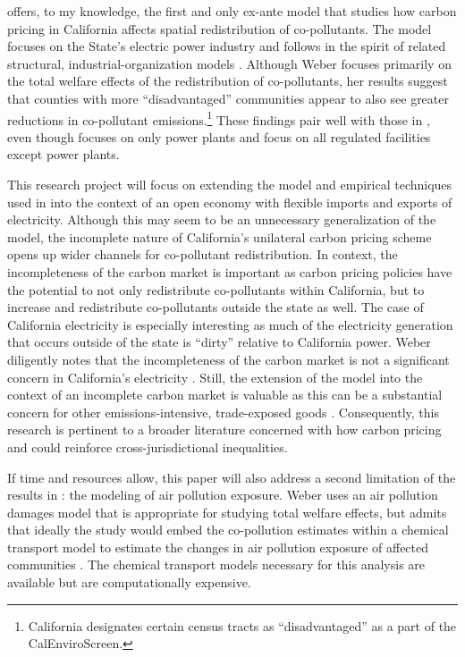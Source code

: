 \documentclass[11pt]{article}
\begin{document}
\cite{weber2021dynamic} offers, to my knowledge, the first and only ex-ante model that studies how carbon pricing in California affects spatial redistribution of co-pollutants. The model focuses on the State's electric power industry and follows in the spirit of related structural, industrial-organization models \citep[e.g., ~][]{gowrisankaran2022policy, abito2022role}. Although Weber focuses primarily on the total welfare effects of the redistribution of co-pollutants, her results suggest that counties with more ``disadvantaged” communities appear to also see greater reductions in co-pollutant emissions.\footnote{California designates certain census tracts as ``disadvantaged” as a part of the CalEnviroScreen.} These findings pair well with those in \cite{hernandez2023environmental}, even though \cite{weber2021dynamic} focuses on only power plants and \cite{hernandez2023environmental} focus on all regulated facilities except power plants.

This research project will focus on extending the model and empirical techniques used in \cite{weber2021dynamic} into the context of an open economy with flexible imports and exports of electricity. Although this may seem to be an unnecessary generalization of the model, the incomplete nature of California's unilateral carbon pricing scheme opens up wider channels for co-pollutant redistribution. In context, the incompleteness of the carbon market is important as carbon pricing policies have the potential to not only redistribute co-pollutants within California, but to increase and redistribute co-pollutants outside the state as well. The case of California electricity is especially interesting as much of the electricity generation that occurs outside of the state is ``dirty” relative to California power. Weber diligently notes that the incompleteness of the carbon market is not a significant concern in California's electricity \citep{burtraw2018}. Still, the extension of the model into the context of an incomplete carbon market is valuable as this can be a substantial concern for other emissions-intensive, trade-exposed goods \citep{fowlie2022mitigating}. Consequently, this research is pertinent to a broader literature concerned with how carbon pricing and could reinforce cross-jurisdictional inequalities. 

If time and resources allow, this paper will also address a second limitation of the results in \cite{weber2021dynamic}: the modeling of air pollution exposure. Weber uses an air pollution damages model that is appropriate for studying total welfare effects, but admits that ideally the study would embed the co-pollution estimates within a chemical transport model to estimate the changes in air pollution exposure of affected communities \citep[the approach in~][]{hernandez2023environmental}. The chemical transport models necessary for this analysis are available but are computationally expensive.
\end{document}

